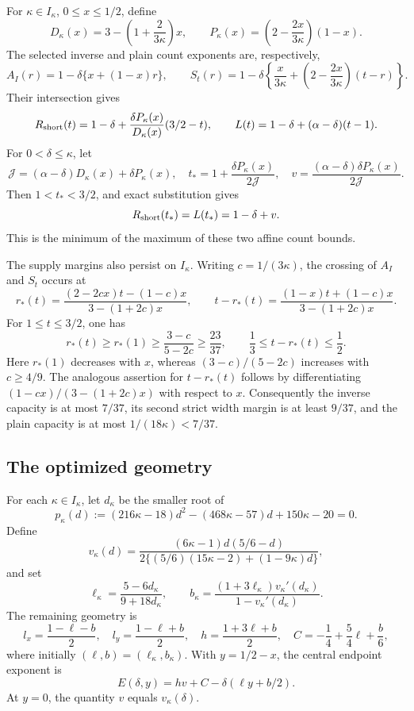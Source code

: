 \documentclass[11pt,a4paper]{article}
\numberwithin{equation}{section}
\theoremstyle{remark}
\begin{document}
For \(\kappa\in I_\kappa\), \(0\le x\le1/2\), define
\[
 D_\kappa(x)=3-\left(1+\frac{2}{3\kappa}\right)x,
 \qquad
 P_\kappa(x)=\left(2-\frac{2x}{3\kappa}\right)(1-x).
\]
The selected inverse and plain count exponents are, respectively,
\[
 A_I(r)=1-\delta\{x+(1-x)r\},\qquad
 S_t(r)=1-\delta\left\{\frac{x}{3\kappa}
       +\left(2-\frac{2x}{3\kappa}\right)(t-r)\right\}.
\]
Their intersection gives
\[
 R_{\rm short}(t)=1-\delta+
       \frac{\delta P_\kappa(x)}{D_\kappa(x)}(3/2-t),
 \qquad
 L(t)=1-\delta+(\alpha-\delta)(t-1).
\]
For \(0<\delta\le\kappa\), let
\[
 \mathcal J=(\alpha-\delta)D_\kappa(x)+\delta P_\kappa(x),
 \quad t_*=1+\frac{\delta P_\kappa(x)}{2\mathcal J},
 \quad
 v=\frac{(\alpha-\delta)\delta P_\kappa(x)}{2\mathcal J}.
\]
Then \(1<t_*<3/2\), and exact substitution gives
\[
 R_{\rm short}(t_*)=L(t_*)=1-\delta+v.
\]
This is the minimum of the maximum of these two affine count bounds.

The supply margins also persist on \(I_\kappa\).  Writing
\(c=1/(3\kappa)\), the crossing of \(A_I\) and \(S_t\) occurs at
\[
 r_*(t)=\frac{(2-2cx)t-(1-c)x}{3-(1+2c)x},\qquad
 t-r_*(t)=\frac{(1-x)t+(1-c)x}{3-(1+2c)x}.
\]
For \(1\le t\le3/2\), one has
\[
 r_*(t)\ge r_*(1)\ge\frac{3-c}{5-2c}\ge\frac{23}{37},
 \qquad \frac13\le t-r_*(t)\le\frac12.
\]
Here \(r_*(1)\) decreases with \(x\), whereas
\((3-c)/(5-2c)\) increases with \(c\ge4/9\).
The analogous assertion for \(t-r_*(t)\) follows by differentiating
\((1-cx)/(3-(1+2c)x)\) with respect to \(x\).
Consequently the inverse capacity is at most \(7/37\), its second
strict width margin is at least \(9/37\), and the plain capacity is at
most \(1/(18\kappa)<7/37\).

\subsection{The optimized geometry}

For each \(\kappa\in I_\kappa\), let \(d_\kappa\) be the smaller root of
\begin{equation}\label{eq:audit-root-polynomial}
 p_\kappa(d):=(216\kappa-18)d^2-(468\kappa-57)d+150\kappa-20=0.
\end{equation}
Define
\[
 v_\kappa(d)=
 \frac{(6\kappa-1)d(5/6-d)}
 {2\{(5/6)(15\kappa-2)+(1-9\kappa)d\}},
\]
and set
\begin{equation}\label{eq:audit-optimal-geometry}
 \ell_\kappa=\frac{5-6d_\kappa}{9+18d_\kappa},\qquad
 b_\kappa=
 \frac{(1+3\ell_\kappa)v_\kappa'(d_\kappa)}
      {1-v_\kappa'(d_\kappa)}.
\end{equation}
The remaining geometry is
\[
 l_x=\frac{1-\ell-b}{2},\quad
 l_y=\frac{1-\ell+b}{2},\quad
 h=\frac{1+3\ell+b}{2},\quad
 C=-\frac14+\frac54\ell+\frac b6,
\]
where initially \((\ell,b)=(\ell_\kappa,b_\kappa)\).
With \(y=1/2-x\), the central endpoint exponent is
\begin{equation}\label{eq:audit-endpoint}
 E(\delta,y)=h v+C-\delta(\ell y+b/2).
\end{equation}
At \(y=0\), the quantity \(v\) equals \(v_\kappa(\delta)\).
\end{document}
